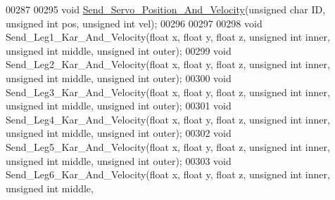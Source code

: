 \begin{DoxyCode}
00287 
00295 \textcolor{keywordtype}{void} \hyperlink{servo___u_a_r_t_8h_aef28545296037ecc0350638a407a680f}{Send\_Servo\_Position\_And\_Velocity}(\textcolor{keywordtype}{unsigned} \textcolor{keywordtype}{char} ID, \textcolor{keywordtype}{unsigned} \textcolor{keywordtype}{int} pos, \textcolor{keywordtype}{
      unsigned} \textcolor{keywordtype}{int} vel);
00296 
00297 
00298 \textcolor{keywordtype}{void} Send\_Leg1\_Kar\_And\_Velocity(\textcolor{keywordtype}{float} x, \textcolor{keywordtype}{float} y, \textcolor{keywordtype}{float} z, \textcolor{keywordtype}{unsigned} \textcolor{keywordtype}{int} inner, \textcolor{keywordtype}{unsigned} \textcolor{keywordtype}{int} middle, \textcolor{keywordtype}{
      unsigned} \textcolor{keywordtype}{int} outer);
00299 \textcolor{keywordtype}{void} Send\_Leg2\_Kar\_And\_Velocity(\textcolor{keywordtype}{float} x, \textcolor{keywordtype}{float} y, \textcolor{keywordtype}{float} z, \textcolor{keywordtype}{unsigned} \textcolor{keywordtype}{int} inner, \textcolor{keywordtype}{unsigned} \textcolor{keywordtype}{int} middle, \textcolor{keywordtype}{
      unsigned} \textcolor{keywordtype}{int} outer);
00300 \textcolor{keywordtype}{void} Send\_Leg3\_Kar\_And\_Velocity(\textcolor{keywordtype}{float} x, \textcolor{keywordtype}{float} y, \textcolor{keywordtype}{float} z, \textcolor{keywordtype}{unsigned} \textcolor{keywordtype}{int} inner, \textcolor{keywordtype}{unsigned} \textcolor{keywordtype}{int} middle, \textcolor{keywordtype}{
      unsigned} \textcolor{keywordtype}{int} outer);
00301 \textcolor{keywordtype}{void} Send\_Leg4\_Kar\_And\_Velocity(\textcolor{keywordtype}{float} x, \textcolor{keywordtype}{float} y, \textcolor{keywordtype}{float} z, \textcolor{keywordtype}{unsigned} \textcolor{keywordtype}{int} inner, \textcolor{keywordtype}{unsigned} \textcolor{keywordtype}{int} middle, \textcolor{keywordtype}{
      unsigned} \textcolor{keywordtype}{int} outer);
00302 \textcolor{keywordtype}{void} Send\_Leg5\_Kar\_And\_Velocity(\textcolor{keywordtype}{float} x, \textcolor{keywordtype}{float} y, \textcolor{keywordtype}{float} z, \textcolor{keywordtype}{unsigned} \textcolor{keywordtype}{int} inner, \textcolor{keywordtype}{unsigned} \textcolor{keywordtype}{int} middle, \textcolor{keywordtype}{
      unsigned} \textcolor{keywordtype}{int} outer);
00303 \textcolor{keywordtype}{void} Send\_Leg6\_Kar\_And\_Velocity(\textcolor{keywordtype}{float} x, \textcolor{keywordtype}{float} y, \textcolor{keywordtype}{float} z, \textcolor{keywordtype}{unsigned} \textcolor{keywordtype}{int} inner, \textcolor{keywordtype}{unsigned} \textcolor{keywordtype}{int} middle, \textcolor{keywordtype}{
}
\end{DoxyCode}
